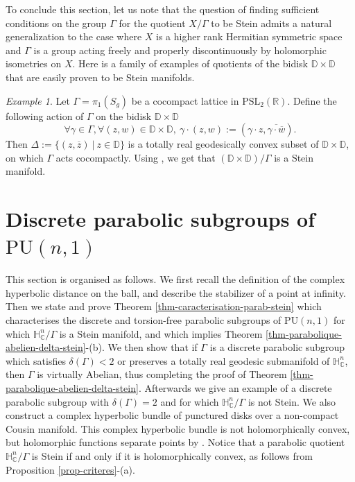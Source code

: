 \documentclass{article}
\theoremstyle{definition}
\theoremstyle{remark}
\newtheorem*{example}{Example}
\newcommand{\C}{\mathbb{C}}
\newcommand{\R}{\mathbb{R}}
\newcommand{\HNC}{\mathbb{H}^{n}_{\C}}
\newcommand{\PU}{\mathrm{PU}}
\begin{document}
	To conclude this section, let us note that the question of finding sufficient conditions on the group $\Gamma$ for the quotient $X/\Gamma$ to be Stein admits a natural generalization to the case where $X$ is a higher rank Hermitian symmetric space and $\Gamma$ is a group acting freely and properly discontinuously by holomorphic isometries on $X$. Here is a family of examples of quotients of the bidisk $\mathbb{D}\times \mathbb{D}$ that are easily proven to be Stein manifolds.
	
	\begin{example}
		Let $\Gamma=\pi_1(S_g)$ be a cocompact lattice in $\mathrm{PSL}_2(\R)$. Define the following action of $\Gamma$ on the bidisk $\mathbb{D}\times \mathbb{D}$\begin{equation*}
			\forall \gamma \in \Gamma, \forall (z,w)\in \mathbb{D}\times \mathbb{D},\ \gamma\cdot (z,w) := (\gamma \cdot z,\overline{\gamma \cdot \overline{w}}).
		\end{equation*}
		Then $\Delta := \{(z,\overline{z}) \ \vert \ z\in \mathbb{D}\}$ is a totally real geodesically convex subset of $\mathbb{D}\times \mathbb{D}$, on which $\Gamma$ acts cocompactly. Using \cite[Proposition 3.2]{chenDiscreteGroupsHolomorphic2013}, we get that $(\mathbb{D}\times \mathbb{D})/\Gamma$ is a Stein manifold.
	\end{example}
	
	\section{Discrete parabolic subgroups of $\PU(n,1)$}\label{section-paraboliques}
	
	This section is organised as follows. We first recall the definition of the complex hyperbolic distance on the ball, and describe the stabilizer of a point at infinity. Then we state and prove Theorem \ref{thm-caracterisation-parab-stein} which characterises the discrete and torsion-free parabolic subgroups of $\PU(n,1)$ for which $\HNC/\Gamma$ is a Stein manifold, and which implies Theorem \ref{thm-parabolique-abelien-delta-stein}-(b). We then show that if $\Gamma$ is a discrete parabolic subgroup which satisfies $\delta(\Gamma)<2$ or preserves a totally real geodesic submanifold of $\HNC$, then $\Gamma$ is virtually Abelian, thus completing the proof of Theorem \ref{thm-parabolique-abelien-delta-stein}. Afterwards we give an example of a discrete parabolic subgroup with $\delta(\Gamma)=2$ and for which $\HNC/\Gamma$ is not Stein. We also construct a complex hyperbolic bundle of punctured disks over a non-compact Cousin manifold. This complex hyperbolic bundle is not holomorphically convex, but holomorphic functions separate points by \cite[Theorem 1.1]{miebachQuotientsBoundedHomogeneous2024}. Notice that a parabolic quotient $\HNC/\Gamma$ is Stein if and only if it is holomorphically convex, as follows from Proposition \ref{prop-criteres}-(a).
	
\end{document}
